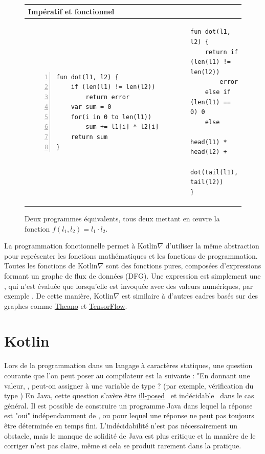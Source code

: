 \begin{figure}[t]
    \centering
    \begin{tabular}{|l|l|}
        \hline
        Impératif et fonctionnel \\
        \hline
{\begin{lstlisting}[style=barelisting, linewidth=5.7cm, numbers=left]
fun dot(l1, l2) {
    if (len(l1) != len(l2))
        return error
    var sum = 0
    for(i in 0 to len(l1))
        sum += l1[i] * l2[i]
    return sum
}
\end{lstlisting}}
        &
{\begin{lstlisting}[style=barelisting, linewidth=6.5cm, numbers=none]
fun dot(l1, l2) {
    return if (len(l1) != len(l2))
        error
    else if (len(l1) == 0) 0
    else
        head(l1) * head(l2) +
        dot(tail(l1), tail(l2))
}
\end{lstlisting}}
        \\
        \hline
    \end{tabular}
    \caption{Deux programmes équivalents, tous deux mettant en œuvre la fonction $f(l_1, l_2) = l_1 \cdot l_2$.}
    \label{fig:fp_vs_ip}
\end{figure}

La programmation fonctionnelle permet à Kotlin$\nabla$ d'utiliser la même abstraction pour représenter les fonctions mathématiques et les fonctions de programmation. Toutes les fonctions de Kotlin$\nabla$ sont des fonctions pures, composées d'expressions formant un graphe de flux de données (DFG). Une expression est simplement une , qui n'est évaluée que lorsqu'elle est invoquée avec des valeurs numériques, par exemple . De cette manière, Kotlin$\nabla$ est similaire à d'autres cadres basés sur des graphes comme \href{http://deeplearning.net/software/theano/extending/graphstructures.html}{Theano} et \href{https://www.tensorflow.org/guide/graphs}{TensorFlow}.

\section{Kotlin}\label{sec:kotlin}

Lors de la programmation dans un langage à caractères statiques, une question courante que l'on peut poser au compilateur est la suivante : "En donnant une valeur, , peut-on assigner  à une variable de type ? (par exemple, vérification du type ) En Java, cette question s'avère être \href{http://io.livecode.ch/learn/namin/unsound}{ill-posed}~\citep{amin2016java} et indécidable~\citep{grigore2017java} dans le cas général. Il est possible de construire un programme Java dans lequel la réponse est "oui" indépendamment de , ou pour lequel une réponse ne peut pas toujours être déterminée en temps fini. L'indécidabilité n'est pas nécessairement un obstacle, mais le manque de solidité de Java est plus critique et la manière de le corriger n'est pas claire, même si cela se produit rarement dans la pratique.

